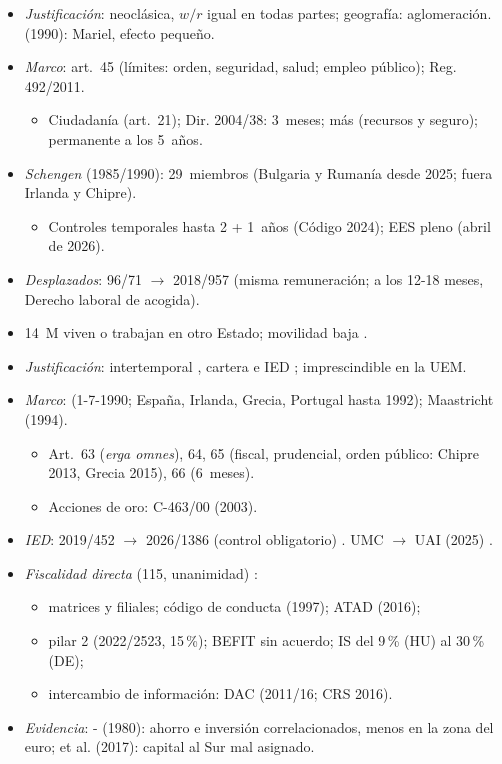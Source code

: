 \documentclass{article}
\begin{document}
\begin{columnas}
\begin{itemize}
\item \emph{Justificación}: neoclásica, $w/r$ igual en todas partes; geografía: aglomeración.  (1990): Mariel, efecto pequeño.
\item \emph{Marco}: art.~45 (límites: orden, seguridad, salud; empleo público); Reg. 492/2011.
  \begin{itemize}
  \item Ciudadanía (art.~21); Dir. 2004/38: 3~meses; más (recursos y seguro); permanente a los 5~años.
  \end{itemize}
\item \emph{Schengen} (1985/1990): 29~miembros (Bulgaria y Rumanía desde 2025; fuera Irlanda y Chipre).
  \begin{itemize}
  \item Controles temporales hasta 2 + 1~años (Código 2024); EES pleno (abril de 2026).
  \end{itemize}
\item \emph{Desplazados}: 96/71 $\to$ 2018/957 (misma remuneración; a los 12-18 meses, Derecho laboral de acogida).
\item 14~M viven o trabajan en otro Estado; movilidad baja .
\end{itemize}

\begin{itemize}
\item \emph{Justificación}: intertemporal , cartera e IED ; imprescindible en la UEM.
\item \emph{Marco}:  (1-7-1990; España, Irlanda, Grecia, Portugal hasta 1992); Maastricht (1994).
  \begin{itemize}
  \item Art.~63 (\emph{erga omnes}), 64, 65 (fiscal, prudencial, orden público: Chipre 2013, Grecia 2015), 66 (6~meses).
  \item Acciones de oro: C-463/00 (2003).
  \end{itemize}
\item \emph{IED}: 2019/452 $\to$ 2026/1386 (control obligatorio) . UMC $\to$ UAI (2025) .
\item \emph{Fiscalidad directa} (115, unanimidad) :
  \begin{itemize}
  \item matrices y filiales; código de conducta (1997); ATAD (2016);
  \item pilar 2 (2022/2523, 15\,\%); BEFIT sin acuerdo; IS del 9\,\% (HU) al 30\,\% (DE);
  \item intercambio de información: DAC (2011/16; CRS 2016).
  \end{itemize}
\item \emph{Evidencia}: - (1980): ahorro e inversión correlacionados, menos en la zona del euro;  et al. (2017): capital al Sur mal asignado.
\end{itemize}


\end{columnas}
\end{document}
